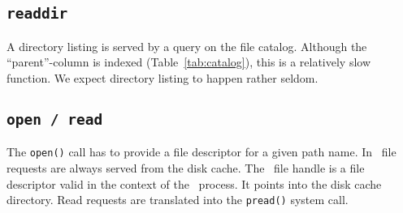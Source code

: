 \subsection{\tt readdir}
A directory listing is served by a query on the file catalog.
Although the ``parent''-column is indexed (\cf Table~\ref{tab:catalog}), this is a relatively slow function.
We expect directory listing to happen rather seldom.

\subsection{\tt open / read}
The \texttt{open()} call has to provide a file descriptor for a given path name.
In \cvmfs\ file requests are always served from the disk cache.
The \fuse\ file handle is a file descriptor valid in the context of the \cvmfs\ process.
It points into the disk cache directory.
Read requests are translated into the \texttt{pread()} system call.

